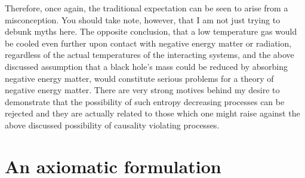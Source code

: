 \documentclass[notitlepage,12pt]{report}
\begin{document}
Therefore, once again, the traditional expectation can be seen to arise from a misconception. You should take note, however, that I am not just trying to debunk myths here. The opposite conclusion, that a low temperature gas would be cooled even further upon contact with negative energy matter or radiation, regardless of the actual temperatures of the interacting systems, and the above discussed assumption that a black hole's mass could be reduced by absorbing negative energy matter, would constitute serious problems for a theory of negative energy matter. There are very strong motives behind my desire to demonstrate that the possibility of such entropy decreasing processes can be rejected and they are actually related to those which one might raise against the above discussed possibility of causality violating processes.

\section{An axiomatic formulation}
\end{document}
